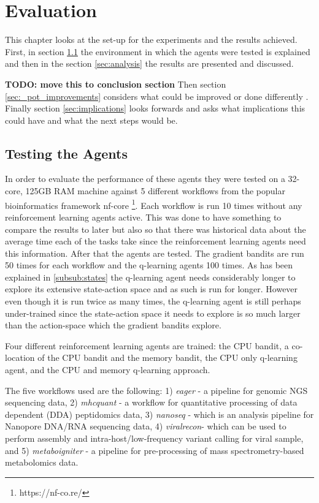 
\cleardoublepage
\chapter{Evaluation}
\label{cha:evaluation}

This chapter looks at the set-up for the experiments and the results achieved. First, in section \ref{sec:testing} the environment in which the agents were tested is explained and then in the section \ref{sec:analysis} the results are presented and discussed. 

\textbf{TODO: move this to conclusion section} Then section \ref{sec:_pot_improvements} considers what could be improved or done differently . Finally section \ref{sec:implications} looks forwards and asks what implications this could have and what the next steps would be.


\section{Testing the Agents}
\label{sec:testing}

In order to evaluate the performance of these agents they were tested on a 32-core, 125GB RAM machine against 5 different workflows from the popular bioinformatics framework nf-core \footnote{https://nf-co.re/}. Each workflow is run 10 times without any reinforcement learning agents active. This was done to have something to compare the results to later but also so that there was historical data about the average time each of the tasks take since the reinforcement learning agents need this information. After that the agents are tested. The gradient bandits are run 50 times for each workflow and the q-learning agents 100 times. As has been explained in \ref{subsub:states} the q-learning agent needs considerably longer to explore its extensive state-action space and as such is run for longer. However even though it is run twice as many times, the q-learning agent is still perhaps under-trained since the state-action space it needs to explore is so much larger than the action-space which the gradient bandits explore. 

Four different reinforcement learning agents are trained: the CPU bandit, a co-location of the CPU bandit and the memory bandit, the CPU only q-learning agent, and the CPU and memory q-learning approach. 

The five workflows used are the following: 1) \textit{eager} - a pipeline for genomic NGS sequencing data, 2) \textit{mhcquant} - a workflow for quantitative processing of data dependent (DDA) peptidomics data, 3) \textit{nanoseq} - which is an analysis pipeline for Nanopore DNA/RNA sequencing data, 4) \textit{viralrecon}- which can be  used to perform assembly and intra-host/low-frequency variant calling for viral sample, and 5)  \textit{metaboigniter} - a pipeline for pre-processing of mass spectrometry-based metabolomics data. 

